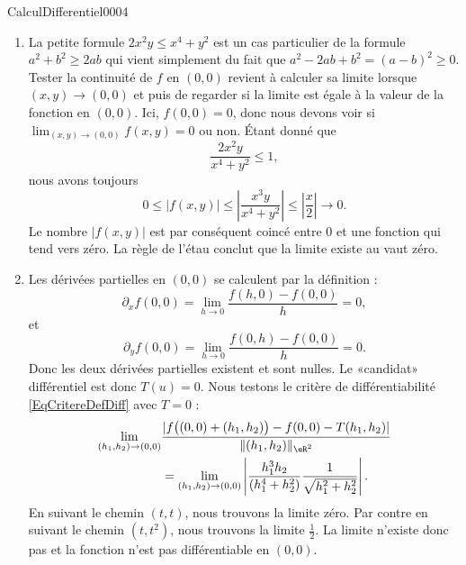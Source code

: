 \begin{corrige}{CalculDifferentiel0004}

	\begin{enumerate}
		\item
			La petite formule $2x^2y\leq x^4+y^2$ est un cas particulier de la formule $a^2+b^2\geq 2ab$ qui vient simplement du fait que $a^2-2ab+b^2=(a-b)^2\geq 0$. Tester la continuité de $f$ en $(0,0)$ revient à calculer sa limite lorsque $(x,y)\to (0,0)$ et puis de regarder si la limite est égale à la valeur de la fonction en $(0,0)$. Ici, $f(0,0)=0$, donc nous devons voir si $\lim_{(x,y)\to(0,0)}f(x,y)=0$ ou non. Étant donné que 
			\begin{equation}
				\frac{ 2x^2y }{ x^4+y^2 }\leq 1,
			\end{equation}
			nous avons toujours
			\begin{equation}
				0\leq | f(x,y) |\leq \left| \frac{ x^3y }{ x^4+y^2 } \right| \leq\left| \frac{ x }{ 2 } \right| \to 0.
			\end{equation}
			Le nombre $| f(x,y) |$ est par conséquent coincé entre $0$ et une fonction qui tend vers zéro. La règle de l'étau conclut que la limite existe au vaut zéro.

		\item
			Les dérivées partielles en $(0,0)$ se calculent par la définition :
			\begin{equation}
				\partial_xf(0,0)=\lim_{h\to 0} \frac{ f(h,0)-f(0,0) }{ h }=0,
			\end{equation}
			et
			\begin{equation}
				\partial_yf(0,0)=\lim_{h\to 0} \frac{ f(0,h)-f(0,0) }{ h }=0.
			\end{equation}
			Donc les deux dérivées partielles existent et sont nulles. Le «candidat» différentiel est donc $T(u)=0$. Nous testons le critère de différentiabilité \eqref{EqCritereDefDiff} avec $T=0$ :
			\begin{equation}
				\begin{aligned}[]
				\lim_{(h_1,h_2)\to (0,0)} &\frac{ | f\big( (0,0)+(h_1,h_2) \big)-f(0,0)-T(h_1,h_2) | }{ \| (h_1,h_2) \|_{\eR^2} }\\
					&=\lim_{(h_1,h_2)\to(0,0)}\left| \frac{ h_1^3h_2 }{ (h_1^4+h_2^2) }\frac{1}{ \sqrt{h_1^2+h_2^2} } \right|.
				\end{aligned}
			\end{equation}
			En suivant le chemin $(t,t)$, nous trouvons la limite zéro. Par contre en suivant le chemin $(t,t^2)$, nous trouvons la limite $\frac{ 1 }{2}$. La limite n'existe donc pas et la fonction n'est pas différentiable en $(0,0)$.
	\end{enumerate}

\end{corrige}
